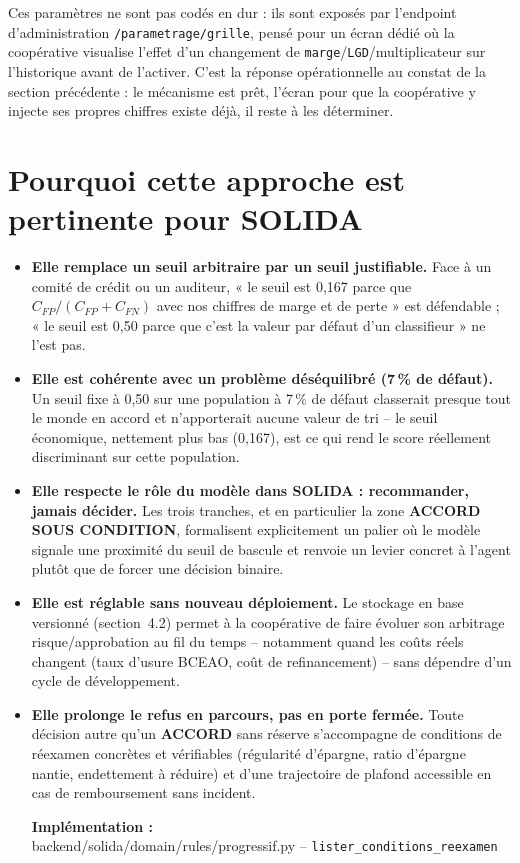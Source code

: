 \documentclass[11pt,a4paper]{article}
\newcommand{\fichier}[1]{\noindent\textbf{Implémentation :} \\ \tiny\ttfamily#1\normalfont\normalsize\par}
\newcommand{\tranche}[2]{\textcolor{#1}{\textbf{#2}}}
\begin{document}
Ces paramètres ne sont pas codés en dur : ils sont exposés par l'endpoint d'administration
\texttt{/parametrage/grille}, pensé pour un écran dédié où la coopérative visualise l'effet d'un
changement de \texttt{marge}/\texttt{LGD}/multiplicateur sur l'historique avant de l'activer. C'est
la réponse opérationnelle au constat de la section précédente : le mécanisme est prêt, l'écran
pour que la coopérative y injecte ses propres chiffres existe déjà, il reste à les déterminer.

\section{Pourquoi cette approche est pertinente pour SOLIDA}

\begin{itemize}
\item \textbf{Elle remplace un seuil arbitraire par un seuil justifiable.} Face à un comité de
crédit ou un auditeur, « le seuil est 0,167 parce que $C_{FP}/(C_{FP}+C_{FN})$ avec nos chiffres de
marge et de perte » est défendable ; « le seuil est 0,50 parce que c'est la valeur par défaut d'un
classifieur » ne l'est pas.
\item \textbf{Elle est cohérente avec un problème déséquilibré (7\,\% de défaut).} Un seuil fixe à
0,50 sur une population à 7\,\% de défaut classerait presque tout le monde en accord et n'apporterait
aucune valeur de tri -- le seuil économique, nettement plus bas (0,167), est ce qui rend le score
réellement discriminant sur cette population.
\item \textbf{Elle respecte le rôle du modèle dans SOLIDA : recommander, jamais décider.} Les
trois tranches, et en particulier la zone \tranche{orangevigilance}{ACCORD SOUS CONDITION},
formalisent explicitement un palier où le modèle signale une proximité du seuil de bascule et
renvoie un levier concret à l'agent plutôt que de forcer une décision binaire.
\item \textbf{Elle est réglable sans nouveau déploiement.} Le stockage en base versionné
(section~4.2) permet à la coopérative de faire évoluer son arbitrage risque/approbation au fil du
temps -- notamment quand les coûts réels changent (taux d'usure BCEAO, coût de refinancement) --
sans dépendre d'un cycle de développement.
\item \textbf{Elle prolonge le refus en parcours, pas en porte fermée.} Toute décision autre
qu'un \tranche{vertaccord}{ACCORD} sans réserve s'accompagne de conditions de réexamen concrètes
et vérifiables (régularité d'épargne, ratio d'épargne nantie, endettement à réduire) et d'une
trajectoire de plafond accessible en cas de remboursement sans incident.

\fichier{backend/solida/domain/rules/progressif.py -- \texttt{lister\_conditions\_reexamen}}
\end{itemize}
\end{document}

